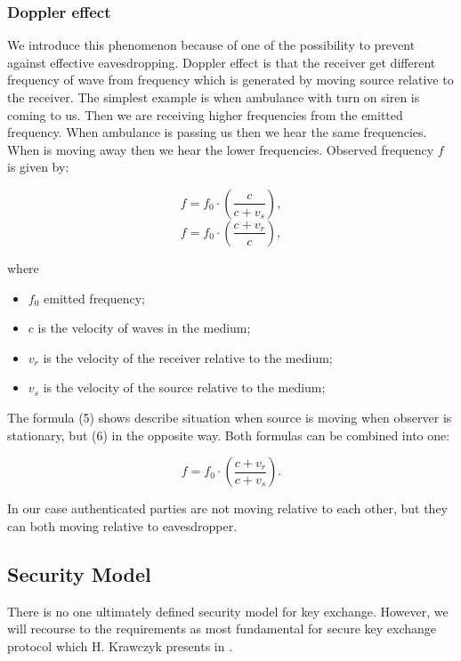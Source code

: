 \documentclass[11pt,titlepage]{article}
\theoremstyle{plain}
\begin{document}
\subsubsection{Doppler effect}
We introduce this phenomenon because of one of the possibility to prevent against effective
eavesdropping. Doppler effect is that the receiver get different frequency of wave from frequency
which is generated by moving source relative to the receiver. The simplest example
is when ambulance with turn on siren is coming to us. Then we are receiving higher frequencies
from the emitted frequency. When ambulance is passing us then we hear the same
frequencies. When is moving away then we hear the lower frequencies. Observed frequency $f$ is given by:

\begin{equation}
	f = f_{0} \cdot \left(\frac {c}{c + v_{s}}\right),
\end{equation}
\begin{equation}
	f = f_{0} \cdot \left(\frac {c + v_{r}}{c}\right),
\end{equation}

where

\begin{itemize}
\item $f_0$ emitted frequency;
\item $c$ is the velocity of waves in the medium;
\item $v_r$ is the velocity of the receiver relative to the medium;
\item $v_s$ is the velocity of the source relative to the medium;
\end{itemize}

The formula (5) shows describe situation when source is moving when observer is stationary, but (6) in the opposite way. Both formulas can be combined into one:

\begin{equation}
	f = f_{0} \cdot \left(\frac {c + v_{r}}{c + v_{s}}\right).
\end{equation}

In our case authenticated parties are not moving relative to each other, but they can both moving relative to eavesdropper.

\subsection{Security Model}
There is no one ultimately defined security model for key exchange. However, we will recourse to the requirements as most fundamental for secure key exchange protocol which H. Krawczyk presents in \cite{sign_mac}.
\end{document}
